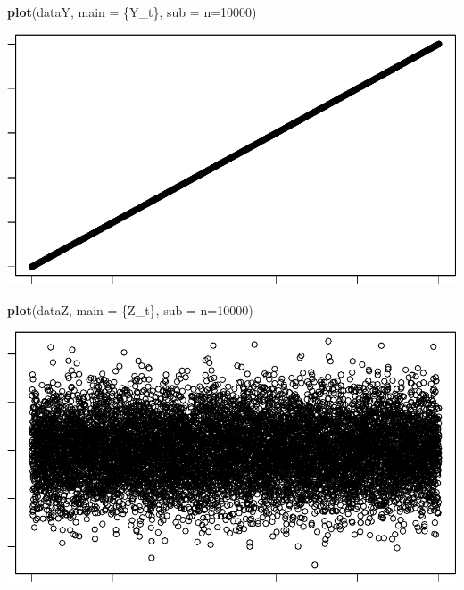 \documentclass[
]{article}
\newenvironment{Shaded}{\begin{snugshade}}{\end{snugshade}}
\newcommand{\AttributeTok}[1]{\textcolor[rgb]{0.13,0.29,0.53}{#1}}
\newcommand{\FunctionTok}[1]{\textcolor[rgb]{0.13,0.29,0.53}{\textbf{#1}}}
\newcommand{\NormalTok}[1]{#1}
\newcommand{\StringTok}[1]{\textcolor[rgb]{0.31,0.60,0.02}{#1}}
\begin{document}
\begin{Shaded}
\begin{Highlighting}[]
\FunctionTok{plot}\NormalTok{(dataY, }\AttributeTok{main =} \StringTok{\textquotesingle{}\{Y\_t\}\textquotesingle{}}\NormalTok{, }\AttributeTok{sub =} \StringTok{\textquotesingle{}n=10000\textquotesingle{}}\NormalTok{)}
\end{Highlighting}
\end{Shaded}

\begin{center}\includegraphics[width=0.8\linewidth]{R_timeseries_HW1_files/figure-latex/unnamed-chunk-1-2} \end{center}

\begin{Shaded}
\begin{Highlighting}[]
\FunctionTok{plot}\NormalTok{(dataZ, }\AttributeTok{main =} \StringTok{\textquotesingle{}\{Z\_t\}\textquotesingle{}}\NormalTok{, }\AttributeTok{sub =} \StringTok{\textquotesingle{}n=10000\textquotesingle{}}\NormalTok{)}
\end{Highlighting}
\end{Shaded}

\begin{center}\includegraphics[width=0.8\linewidth]{R_timeseries_HW1_files/figure-latex/unnamed-chunk-1-3} \end{center}
\end{document}
